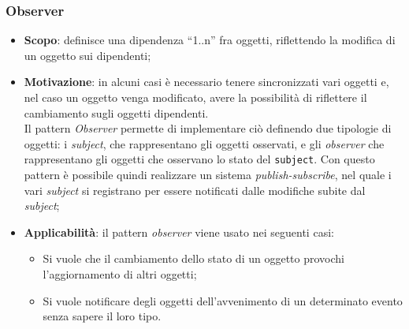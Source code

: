 \subsubsection{Observer}
\begin{itemize}

\item \textbf{Scopo}: definisce una dipendenza “1..n” fra oggetti, riflettendo la modifica di un oggetto sui dipendenti;

\item \textbf{Motivazione}: in alcuni casi è necessario tenere sincronizzati vari oggetti e, nel caso un oggetto venga modificato, avere la possibilità di riflettere il cambiamento sugli oggetti dipendenti. \\ Il pattern \textit{Observer} permette di implementare ciò definendo due tipologie di oggetti: i \textit{subject}, che rappresentano gli oggetti osservati, e gli \textit{observer} che rappresentano gli oggetti che osservano lo stato del \texttt{subject}. Con questo pattern è possibile quindi realizzare un sistema \textit{publish-subscribe}, nel quale i vari \textit{subject} si registrano per essere notificati dalle modifiche subite dal \textit{subject};

\item \textbf{Applicabilità}: il pattern \textit{observer} viene usato nei seguenti casi:
	\begin{itemize}
		\item Si vuole che il cambiamento dello stato di un oggetto provochi l'aggiornamento di altri oggetti;
		\item Si vuole notificare degli oggetti dell'avvenimento di un determinato evento senza sapere il loro tipo.
	\end{itemize}


\end{itemize}
